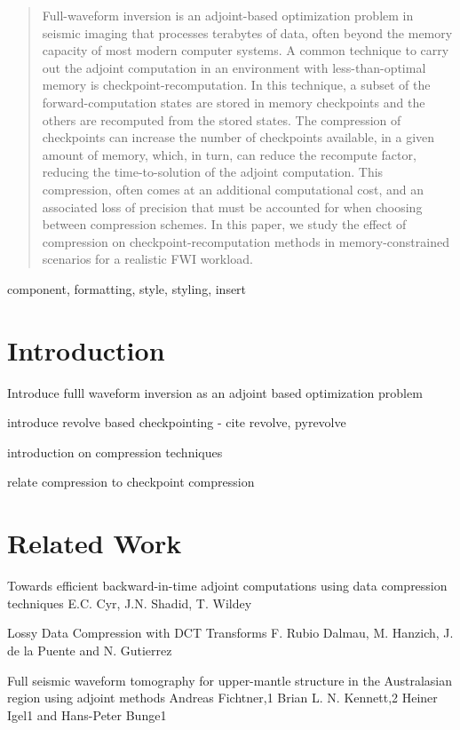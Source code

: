\documentclass[conference]{IEEEtran}
\begin{document}
\begin{abstract}
Full-waveform inversion is an adjoint-based optimization problem in
seismic imaging that processes terabytes of data, often beyond the
memory capacity of most modern computer systems. A common technique to
carry out the adjoint computation in an environment with
less-than-optimal memory is checkpoint-recomputation. In this
technique, a subset of the forward-computation states are stored in
memory checkpoints and the others are recomputed from the stored
states. The compression of checkpoints can increase the number of
checkpoints available, in a given amount of memory, which, in turn,
can reduce the recompute factor, reducing the time-to-solution of the
adjoint computation. This compression, often comes at an additional
computational cost, and an associated loss of precision that must be
accounted for when choosing between compression schemes. In this
paper, we study the effect of compression on checkpoint-recomputation
methods in memory-constrained scenarios for a realistic FWI workload.
\end{abstract}

\begin{IEEEkeywords}
component, formatting, style, styling, insert
\end{IEEEkeywords}

\section{Introduction}
Introduce fulll waveform inversion as an adjoint based optimization
problem

introduce revolve based checkpointing - cite revolve, pyrevolve

introduction on compression techniques

relate compression to checkpoint compression

\section{Related Work}

Towards efficient backward-in-time adjoint computations using data
compression techniques E.C. Cyr, J.N. Shadid, T. Wildey

Lossy Data Compression with DCT Transforms F. Rubio Dalmau,
M. Hanzich, J. de la Puente and N. Gutierrez 

Full seismic waveform tomography for upper-mantle structure in the
Australasian region using adjoint methods
Andreas Fichtner,1 Brian L. N. Kennett,2 Heiner Igel1 and Hans-Peter
Bunge1
\end{document}
